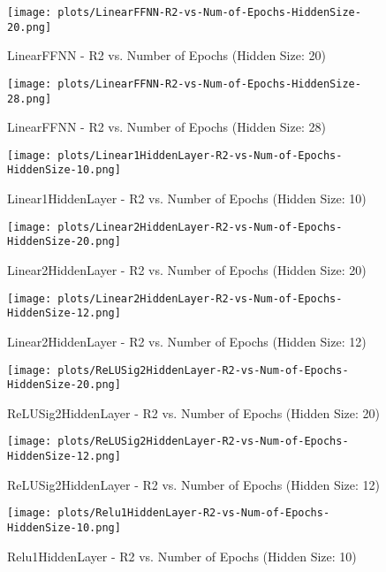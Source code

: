 \begin{figure}[H]
    \centering
    \texttt{[image: plots/LinearFFNN-R2-vs-Num-of-Epochs-HiddenSize-20.png]}
    \caption{LinearFFNN - R2 vs. Number of Epochs (Hidden Size: 20)}
\end{figure}

\begin{figure}[H]
    \centering
    \texttt{[image: plots/LinearFFNN-R2-vs-Num-of-Epochs-HiddenSize-28.png]}
    \caption{LinearFFNN - R2 vs. Number of Epochs (Hidden Size: 28)}
\end{figure}

\begin{figure}[H]
    \centering
    \texttt{[image: plots/Linear1HiddenLayer-R2-vs-Num-of-Epochs-HiddenSize-10.png]}
    \caption{Linear1HiddenLayer - R2 vs. Number of Epochs (Hidden Size: 10)}
\end{figure}

\begin{figure}[H]
    \centering
    \texttt{[image: plots/Linear2HiddenLayer-R2-vs-Num-of-Epochs-HiddenSize-20.png]}
    \caption{Linear2HiddenLayer - R2 vs. Number of Epochs (Hidden Size: 20)}
\end{figure}

\begin{figure}[H]
    \centering
    \texttt{[image: plots/Linear2HiddenLayer-R2-vs-Num-of-Epochs-HiddenSize-12.png]}
    \caption{Linear2HiddenLayer - R2 vs. Number of Epochs (Hidden Size: 12)}
\end{figure}

\begin{figure}[H]
    \centering
    \texttt{[image: plots/ReLUSig2HiddenLayer-R2-vs-Num-of-Epochs-HiddenSize-20.png]}
    \caption{ReLUSig2HiddenLayer - R2 vs. Number of Epochs (Hidden Size: 20)}
\end{figure}

\begin{figure}[H]
    \centering
    \texttt{[image: plots/ReLUSig2HiddenLayer-R2-vs-Num-of-Epochs-HiddenSize-12.png]}
    \caption{ReLUSig2HiddenLayer - R2 vs. Number of Epochs (Hidden Size: 12)}
\end{figure}

\begin{figure}[H]
    \centering
    \texttt{[image: plots/Relu1HiddenLayer-R2-vs-Num-of-Epochs-HiddenSize-10.png]}
    \caption{Relu1HiddenLayer - R2 vs. Number of Epochs (Hidden Size: 10)}
\end{figure}

